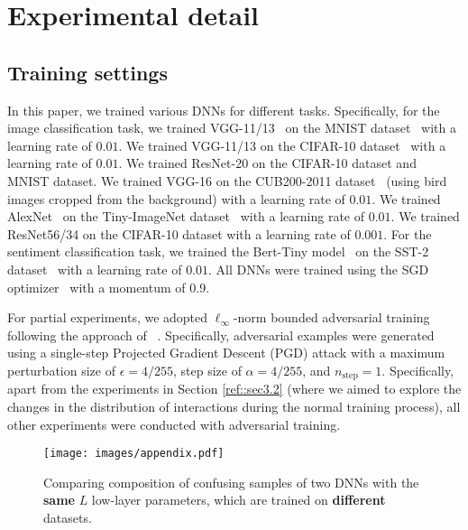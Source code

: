 \documentclass[10pt,twocolumn,letterpaper]{article}
\begin{document}

\section{Experimental detail}\label{sec:experimental_setting}
\subsection{Training settings}
In this paper, we trained various DNNs for different tasks. Specifically, for the image classification task, we trained VGG-11/13~\cite{simonyan2014very} on the MNIST dataset~\cite{lecun1998gradient} with a learning rate of $0.01$. We trained VGG-11/13 on the CIFAR-10 dataset~\cite{krizhevsky2009learning} with a learning rate of $0.01$.  We trained ResNet-20 on the CIFAR-10 dataset and MNIST dataset. We trained VGG-16 on the CUB200-2011 dataset~\cite{wah2011caltech} (using bird images cropped from the background) with a learning rate of $0.01$. We trained AlexNet~\cite{krizhevsky2012imagenet} on the Tiny-ImageNet dataset~\cite{tiny-imagenet} with a learning rate of $0.01$. We trained ResNet56/34 on the CIFAR-10 dataset with a learning rate of $0.001$. For the sentiment classification task, we trained the Bert-Tiny model~\cite{devlin2018bert} on the SST-2 dataset~\cite{socher2013recursive} with a learning rate of $0.01$. All DNNs were trained using the SGD optimizer~\cite{robbins1951stochastic} with a momentum of 0.9.

For partial experiments, we adopted \( \ell_\infty \)-norm bounded adversarial training following the approach of ~\cite{madry2017towards}. Specifically, adversarial examples were generated using a single-step Projected Gradient Descent (PGD) attack with a maximum perturbation size of \( \epsilon = 4/255 \), step size of \( \alpha = 4/255 \), and \( n_{\text{step}} = 1 \). Specifically, apart from the experiments in Section \ref{ref::sec3.2} (where we aimed to explore the changes in the distribution of interactions during the normal training process), all other experiments were conducted with adversarial training.

\begin{figure}[t]
    \centering
    \texttt{[image: images/appendix.pdf]}
    \caption{Comparing composition of confusing samples of two DNNs with the \textbf{same} $L$ low-layer parameters, which are trained on \textbf{different} datasets.}
    \label{ref::appendix}
\end{figure}
\end{document}
